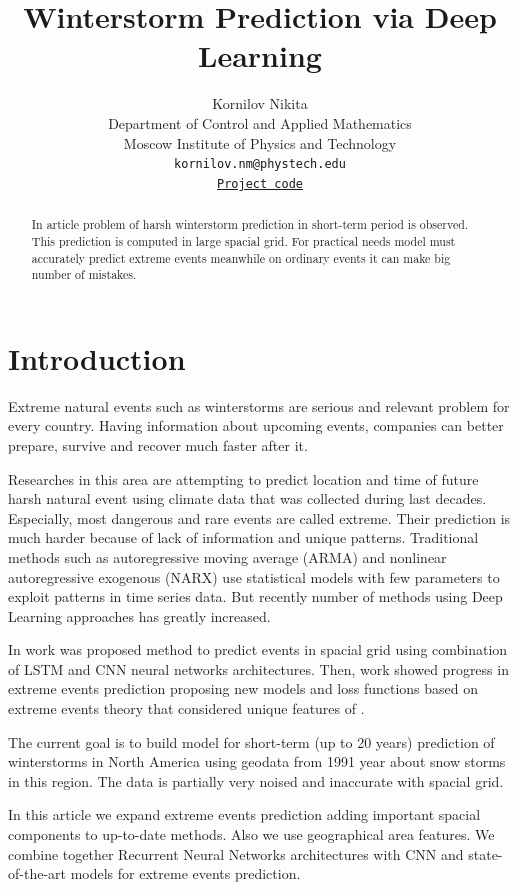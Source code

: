 \documentclass{article}
\title{Winterstorm Prediction via Deep Learning}
\author{ Kornilov Nikita\\
	Department of Control and Applied Mathematics\\
	Moscow Institute of Physics and Technology\\
	\texttt{kornilov.nm@phystech.edu} \\
	\texttt{\href{https://colab.research.google.com/drive/1HBB8002s5_tFgFxGzIZQcBmsOsW6YcMh?usp=sharing} {Project code}}
}
\date{}
\begin{document}
\maketitle

\begin{abstract}
	In article problem of  harsh winterstorm prediction in short-term period is observed. This prediction is computed in large spacial grid. For practical needs model must accurately predict extreme events meanwhile on ordinary events it can make big number of mistakes.
\end{abstract}



\section{Introduction}
Extreme natural events such as winterstorms are serious and relevant problem for every country. Having information about upcoming events, companies can better prepare, survive and recover much faster after it. 

Researches in this area are attempting to predict location and time of future harsh natural event using climate data that was collected during last decades.\cite{EVL:1,LSTMCNN:2, GRUCNN:3} Especially, most dangerous and rare events are called extreme. Their prediction is much harder because of lack of information and unique patterns.
Traditional methods such as autoregressive moving average (ARMA) and nonlinear autoregressive exogenous (NARX) use statistical models with few parameters to exploit
patterns in time series data. But recently number of methods using Deep Learning approaches has greatly increased.  

In work \cite{LSTMCNN:2} was proposed method to predict events in spacial grid using combination of LSTM and CNN  neural networks architectures. Then, work \cite{EVL:1} showed progress in extreme events prediction proposing new models and loss functions based on extreme events theory that considered unique features of .

The current goal is to build model for short-term (up  to 20 years) prediction of winterstorms in North America using geodata from 1991 year about snow storms in this region. The data is partially very noised and inaccurate with spacial grid. 

In this article we expand extreme events prediction adding important spacial components to up-to-date methods. Also we use geographical area features. We combine together Recurrent Neural Networks architectures with CNN and state-of-the-art models for extreme events prediction.
\end{document}

